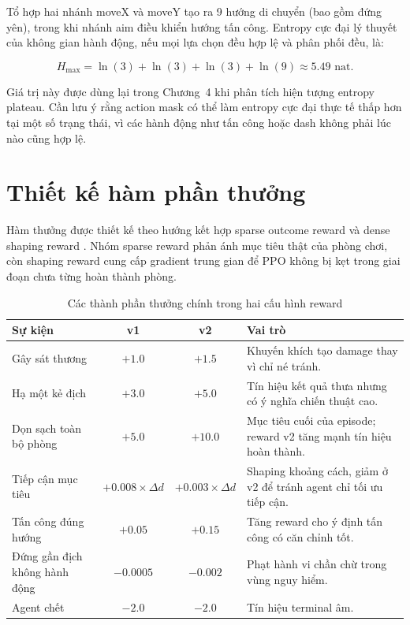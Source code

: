 Tổ hợp hai nhánh moveX và moveY tạo ra 9 hướng di chuyển (bao gồm đứng yên), trong khi nhánh aim điều khiển hướng tấn công. Entropy cực đại lý thuyết của không gian hành động, nếu mọi lựa chọn đều hợp lệ và phân phối đều, là:

\begin{equation}
    H_{\max} = \ln(3) + \ln(3) + \ln(3) + \ln(9) \approx 5.49 \text{ nat}.
    \label{eq:max_entropy}
\end{equation}

Giá trị này được dùng lại trong Chương~4 khi phân tích hiện tượng entropy plateau. Cần lưu ý rằng action mask có thể làm entropy cực đại thực tế thấp hơn tại một số trạng thái, vì các hành động như tấn công hoặc dash không phải lúc nào cũng hợp lệ.

\section{Thiết kế hàm phần thưởng}

Hàm thưởng được thiết kế theo hướng kết hợp sparse outcome reward và dense shaping reward \cite{Ibrahim2024}. Nhóm sparse reward phản ánh mục tiêu thật của phòng chơi, còn shaping reward cung cấp gradient trung gian để PPO không bị kẹt trong giai đoạn chưa từng hoàn thành phòng.

\begin{table}[H]
    \centering
    \small
    \caption{Các thành phần thưởng chính trong hai cấu hình reward}
    \label{tab:reward_components}
    \begin{tabular}{|p{4.4cm}|c|c|p{5.2cm}|}
        \hline
        \textbf{Sự kiện} & \textbf{v1} & \textbf{v2} & \textbf{Vai trò} \\
        \hline
        Gây sát thương & $+1.0$ & $+1.5$ & Khuyến khích tạo damage thay vì chỉ né tránh. \\
        \hline
        Hạ một kẻ địch & $+3.0$ & $+5.0$ & Tín hiệu kết quả thưa nhưng có ý nghĩa chiến thuật cao. \\
        \hline
        Dọn sạch toàn bộ phòng & $+5.0$ & $+10.0$ & Mục tiêu cuối của episode; reward v2 tăng mạnh tín hiệu hoàn thành. \\
        \hline
        Tiếp cận mục tiêu & $+0.008 \times \Delta d$ & $+0.003 \times \Delta d$ & Shaping khoảng cách, giảm ở v2 để tránh agent chỉ tối ưu tiếp cận. \\
        \hline
        Tấn công đúng hướng & $+0.05$ & $+0.15$ & Tăng reward cho ý định tấn công có căn chỉnh tốt. \\
        \hline
        Đứng gần địch không hành động & $-0.0005$ & $-0.002$ & Phạt hành vi chần chừ trong vùng nguy hiểm. \\
        \hline
        Agent chết & $-2.0$ & $-2.0$ & Tín hiệu terminal âm. \\
        \hline
    \end{tabular}
\end{table}

